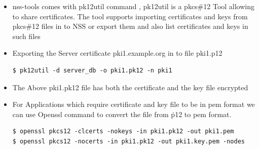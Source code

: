 \documentclass[a4paper]{article}
\begin{document}
\begin{enumerate}[label*=\arabic*.]
\begin{itemize}
            \item nss-tools comes with pk12util command , pk12util is a pkcs\#12 Tool allowing to share certificates. The tool supports importing certificates and keys from pkcs\#12 files in to NSS or export them and also list certificates and keys in such files

            \item Exporting the Server certificate pki1.example.org in to file pki1.p12 
                \begin{lstlisting}[style=BashInputStyle]
$ pk12util -d server_db -o pki1.pk12 -n pki1
                \end{lstlisting}

            \item The Above pki1.pk12 file has both the certificate and the key file encrypted

            \item For Applications which require certificate and key file to be in pem format we can use Openssl command to convert the file from \.p12 to pem format.
                \begin{lstlisting}[style=BashInputStyle]
$ openssl pkcs12 -clcerts -nokeys -in pki1.pk12 -out pki1.pem
$ openssl pkcs12 -nocerts -in pki1.pk12 -out pki1.key.pem -nodes
                \end{lstlisting}
        \end{itemize}
\end{enumerate}
\end{document}
